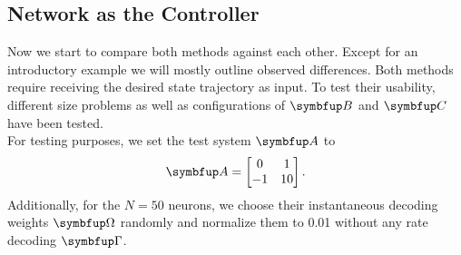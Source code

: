 \subsection{Network as the Controller}
Now we start to compare both methods against each other. Except for an introductory example we will mostly outline observed differences.
Both methods require receiving the desired state trajectory as input. To test their usability, different size problems as well as configurations of $\bmu{B}$ and $\bmu{C}$ have been tested.\\
For testing purposes, we set the test system $\bmu{A}$ to
\begin{equation}
	\bmu{A} = \begin{bmatrix}0 & 1\\-1 & 10\\\end{bmatrix}.
\end{equation}
Additionally, for the $N=50$ neurons, we choose their instantaneous decoding weights $\bmu{\Omega}$ randomly and normalize them to 0.01 without any rate decoding $\bmu{\Gamma}$.

